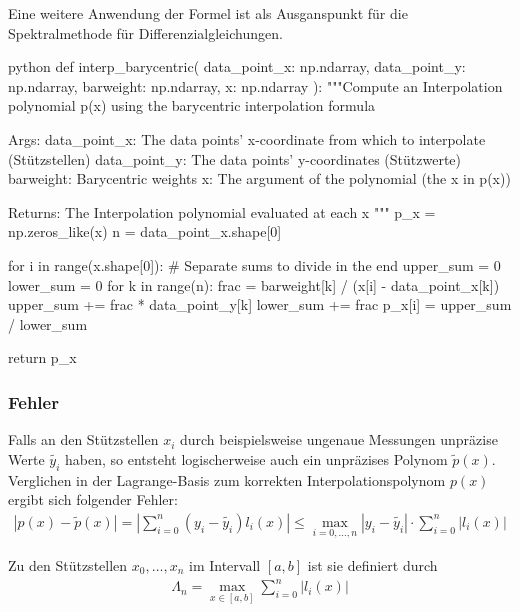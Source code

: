 Eine weitere Anwendung der Formel ist als Ausganspunkt für die Spektralmethode für Differenzialgleichungen.

\begin{code}{python}
    def interp_barycentric(
        data_point_x: np.ndarray,
        data_point_y: np.ndarray,
        barweight: np.ndarray,
        x: np.ndarray
    ):
        """Compute an Interpolation polynomial p(x) using the barycentric interpolation formula

        Args:
            data_point_x: The data points' x-coordinate from which to interpolate (Stützstellen)
            data_point_y: The data points' y-coordinates (Stützwerte)
            barweight: Barycentric weights
            x: The argument of the polynomial (the x in p(x))

        Returns:
            The Interpolation polynomial evaluated at each x
        """
        p_x = np.zeros_like(x)
        n = data_point_x.shape[0]

        for i in range(x.shape[0]):
            # Separate sums to divide in the end
            upper_sum = 0
            lower_sum = 0
            for k in range(n):
                frac = barweight[k] / (x[i] - data_point_x[k])
                upper_sum += frac * data_point_y[k]
                lower_sum += frac
            p_x[i] = upper_sum / lower_sum

        return p_x
\end{code}


\newpage
\subsubsection{Fehler}
Falls an den Stützstellen $x_i$ durch beispielsweise ungenaue Messungen unpräzise Werte $\tilde{y_i}$ haben, so entsteht logischerweise auch ein unpräzises Polynom $\tilde{p}(x)$.
Verglichen in der Lagrange-Basis zum korrekten Interpolationspolynom $p(x)$ ergibt sich folgender Fehler:
\begin{align*}
	|p(x) - \tilde{p}(x)| = \left| \sum_{i = 0}^{n} (y_i - \tilde{y_i}) l_i(x) \right| \leq \max_{i = 0, \ldots, n} |y_i - \tilde{y_i}| \cdot \sum_{i = 0}^{n} |l_i(x)|
\end{align*}


 Zu den Stützstellen $x_0, \ldots, x_n$ im Intervall $[a, b]$ ist sie definiert durch
\rmvspace
\begin{align*}
	\Lambda_n = \max_{x \in [a, b]} \sum_{i = 0}^{n} |l_i(x)|
\end{align*}


